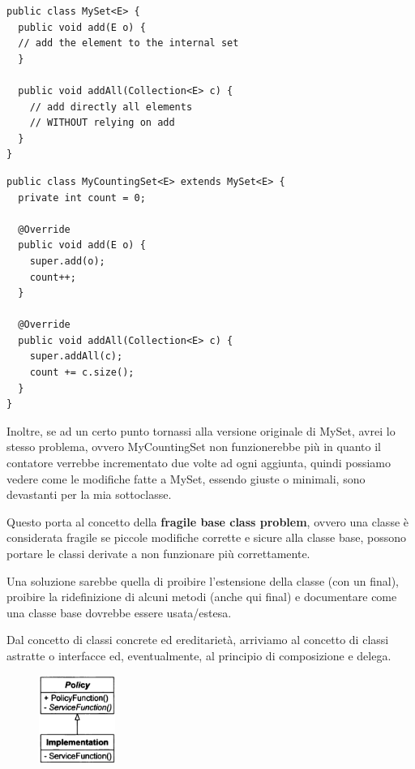 \begin{multicols}{2}
\begin{lstlisting}
public class MySet<E> {
  public void add(E o) {
  // add the element to the internal set
  }

  public void addAll(Collection<E> c) {
    // add directly all elements
    // WITHOUT relying on add
  }
}
\end{lstlisting}
\columnbreak
\begin{lstlisting}
public class MyCountingSet<E> extends MySet<E> {
  private int count = 0;
  
  @Override
  public void add(E o) {
    super.add(o);
    count++;
  }

  @Override
  public void addAll(Collection<E> c) {
    super.addAll(c);
    count += c.size();
  }
} 
\end{lstlisting}
\end{multicols}

Inoltre, se ad un certo punto tornassi alla versione originale di MySet, avrei lo stesso problema, ovvero MyCountingSet non funzionerebbe più in quanto il contatore 
verrebbe incrementato due volte ad ogni aggiunta, quindi possiamo vedere come le modifiche fatte a MySet, essendo giuste o minimali, sono devastanti per la mia 
sottoclasse.
\smallskip

Questo porta al concetto della \textbf{fragile base class problem}, ovvero una classe è considerata fragile se piccole modifiche corrette e sicure alla classe base, 
possono portare le classi derivate a non funzionare più correttamente.

Una soluzione sarebbe quella di proibire l'estensione della classe (con un final), proibire la ridefinizione di alcuni metodi (anche qui final) e documentare come una 
classe base dovrebbe essere usata/estesa.
\smallskip

Dal concetto di classi concrete ed ereditarietà, arriviamo al concetto di classi astratte o interfacce ed, eventualmente, al principio di composizione e delega.

\begin{figure}
  \includegraphics[width=2.5cm]{../../immagini/principio_SOLID/esempioOCP}  
\end{figure}

